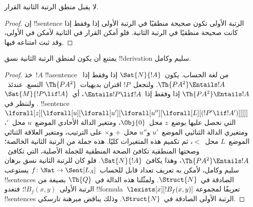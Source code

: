 \documentclass[../../../include/open-logic-section]{subfiles}
\begin{document}


\begin{thm}
لا يقبل منطق الرتبة الثانية القرار.
\end{thm}

\begin{proof}
إن !!{sentence} الرتبة الأولى تكون صحيحة منطقيًا في الرتبة الأولى
إذا وفقط إذا كانت صحيحة منطقيًا في الرتبة الثانية. فلو أمكن القرار
في الثانية لأمكن في الأولى، وقد ثبت امتناعه فيها.
\end{proof}

\begin{thm}
يمتنع أن يكون لمنطق الرتبة الثانية نسق !!{derivation} سليم وكامل.
\end{thm}

\begin{proof}
خذ~$!A$ !!a{sentence} من لغة الحساب.
يكون~$\Sat{N}{!A}$ إذا وفقط إذا~$\Th{PA^2} \Entails !A$.
ولنجعل~$!P$ اقتران بديهيات~$\Th{PA^2}$ التسع.
عندئذ~$\Th{PA^2} \Entails !A$ إذا وفقط إذا~$\Entails !P \lif !A$،
أي~$\Sat{M}{!P \lif !A}$. ولننظر في !!{sentence}
$\lforall[z][\lforall[u][\lforall[u'][\lforall[u''][\lforall[L][(!P' \lif !A')]]]]]$
التي نحصل عليها بوضع~$z$ محل~$\Obj{0}$، ومتغير الدالة الأحادي
الموضع~$u$ محل~$\prime$، ومتغيري الدالة الثنائيي الموضع~$u'$ و$u''$
محل~$+$ و$\times$ على الترتيب، ومتغير العلاقة الثنائي الموضع~$L$
محل~$<$، ثم تكميم هذه المتغيرات كليًا.
هذه جملة من الرتبة الثانية الخالصة؛ وصحتها المنطقية تكافئ
الصحة المنطقية للجملة الأصلية، التي تكافئ~$\Th{PA^2} \Entails !A$،
وهذا يكافئ~$\Sat{N}{!A}$.
فلو كان للرتبة الثانية نسق برهان سليم وكامل، لأمكن به تعريف تعداد
قابل للحساب~$f\colon \Nat \to \Sent[L_A]$ يستوعب
!!{sentence}s الصادقة في~$\Struct{N}$.
ولمثّلنا هذه الدالة في~$\Th{Q}$ بصيغة من الرتبة
الأولى~$!B_f(x, y)$؛ فتغدو !!{formula}~$\lexists[x][!B_f(x, y)]$
تعريفًا لمجموعة !!{sentence}s الرتبة الأولى الصادقة
في~$\Struct{N}$. وذلك يناقض مبرهنة تارسكي.
\end{proof}
\end{document}
